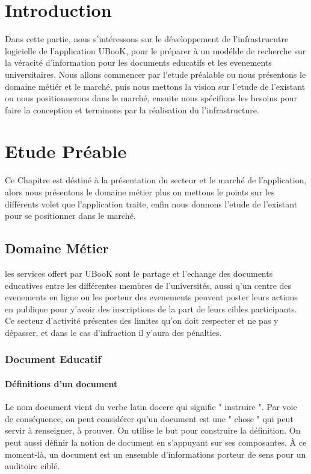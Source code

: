 \documentclass[12pt]{report}
\begin{document}
\chapter*{Introduction}

Dans cette partie, nous s'intéressons sur le développement de l'infrastrucutre logicielle de l'application UBooK, pour le préparer à un modélde de recherche sur la véracité d'information pour les documents educatifs et les evenements universitaires.
Nous allons commencer par l'etude préalable ou nous présentons le domaine métiér et le marché, puis nous mettons la vision sur l'etude de l'existant ou nous positionnerons dans le marché, ensuite nous spécifions les besoins pour faire la conception et terminons par la réalisation du l'infrastructure.
\newpage
\chapter{Etude Préable}
Ce Chapitre est déstiné à la présentation du secteur et le marché de l'application, alors nous présentons le domaine métier plus on mettons le points sur les différents volet que l'application traite, enfin nous donnons l'etude de l'existant pour se positionner dans le marché.
\section{Domaine Métier} 
les services offert par UBooK sont le partage et l'echange des documents educatives entre les différentes membres de l'universités, aussi q'un centre des evenements en ligne ou les porteur des evenements peuvent poster leurs actions en publique pour y'avoir des inscriptions de la part de leurs cibles participants. 
Ce secteur d'activité présentes des limites qu'on doit respecter et ne pas y dépasser, et dans le cas d'infraction il y'aura des pénalties.

\subsection{Document Educatif}


\subsubsection{Définitions d'un document}

Le nom document vient du verbe latin docere qui signifie " instruire ". Par voie de conséquence, on peut considérer qu’un document est une " chose " qui peut servir à renseigner, à prouver. On utilise le but pour construire la définition.
On peut aussi définir la notion de document en s’appuyant sur ses composantes. À ce moment-là, un document est un ensemble d’informations porteur de sens pour un auditoire ciblé\cite{1}.\\
\end{document}
